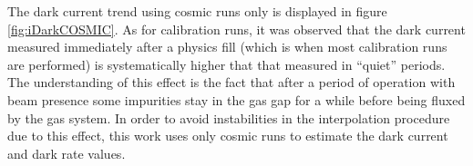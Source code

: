 The dark current trend using cosmic runs only is displayed in figure \ref{fig:iDarkCOSMIC}. 
As for calibration runs, it was observed that the dark current measured immediately after a physics fill (which is when most calibration runs are performed) is systematically higher that that measured in “quiet” periods. 
The understanding of this effect is the fact that after a period of operation with beam presence some impurities stay in the gas gap for a while before being fluxed by the gas system.
In order to avoid instabilities in the interpolation procedure due to this effect, this work uses only cosmic runs to estimate the dark current and dark rate values.

